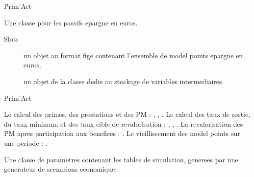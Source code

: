 \documentclass[a4paper]{book}
\begin{document}
%
\begin{Author}\relax
Prim'Act
\end{Author}
%
\begin{Description}\relax
Une classe pour les passifs epargne en euros.
\end{Description}
%
\begin{Section}{Slots}

\begin{description}

\item[] un objet  au format fige contenant l'ensemble de model points epargne en euros.

\item[] un objet de la classe  dedie au stockage de variables intermediaires.

\end{description}
\end{Section}
%
\begin{Author}\relax
Prim'Act
\end{Author}
%
\begin{SeeAlso}\relax
Le calcul des primes, des prestations et des PM : ,
, .
Le calcul des taux de sortie, du taux minimum et des taux cible de revalorisation :
, , .
La revalorisation des PM apres participation aux benefices : .
Le vieillissement des model points sur une periode : .
\end{SeeAlso}
%
\begin{Description}\relax
Une classe de parametres contenant les tables de simulation, generees par une generateur de scenarions
economique.
\end{Description}
%
\end{document}
